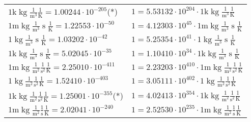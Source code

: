 \begin{center}
\begin{longtable}{l l}
{\color{gray}$1 \bm{\mathrm{ k}}\operatorname{kg}\frac1{\operatorname{m}^3}{}{}\frac1{\operatorname{K}} = 1.00244\cdot10^{-205} $}\quad(*) & {\color{gray}$ 1 = 5.53132\cdot10^{204} \cdot 1 \bm{\mathrm{ k}}\operatorname{kg}\frac1{\operatorname{m}^3}{}{}\frac1{\operatorname{K}}$}  \\
{\color{gray}$1 \bm{\mathrm{ m}}\operatorname{kg}\frac1{\operatorname{m}^3}{\operatorname{s}}{}\frac1{\operatorname{K}} = 1.22553\cdot10^{-50} $}   & {\color{gray}$ 1 = 4.12303\cdot10^{45} \cdot 1 \bm{\mathrm{ m}}\operatorname{kg}\frac1{\operatorname{m}^3}{\operatorname{s}}{}\frac1{\operatorname{K}}$}  \\
{\color{black}$1 \bm{\mathrm{ }}\operatorname{kg}\frac1{\operatorname{m}^3}{\operatorname{s}}{}\frac1{\operatorname{K}} = 1.03202\cdot10^{-42} $}   & {\color{black}$ 1 = 5.25354\cdot10^{41} \cdot 1 \bm{\mathrm{ }}\operatorname{kg}\frac1{\operatorname{m}^3}{\operatorname{s}}{}\frac1{\operatorname{K}}$}  \\
{\color{gray}$1 \bm{\mathrm{ k}}\operatorname{kg}\frac1{\operatorname{m}^3}{\operatorname{s}}{}\frac1{\operatorname{K}} = 5.02045\cdot10^{-35} $}   & {\color{gray}$ 1 = 1.10410\cdot10^{34} \cdot 1 \bm{\mathrm{ k}}\operatorname{kg}\frac1{\operatorname{m}^3}{\operatorname{s}}{}\frac1{\operatorname{K}}$}  \\
{\color{gray}$1 \bm{\mathrm{ m}}\operatorname{kg}\frac1{\operatorname{m}^2}\frac1{\operatorname{s}^2}{}\frac1{\operatorname{K}} = 2.25010\cdot10^{-411} $}   & {\color{gray}$ 1 = 2.23203\cdot10^{410} \cdot 1 \bm{\mathrm{ m}}\operatorname{kg}\frac1{\operatorname{m}^2}\frac1{\operatorname{s}^2}{}\frac1{\operatorname{K}}$}  \\
{\color{black}$1 \bm{\mathrm{ }}\operatorname{kg}\frac1{\operatorname{m}^2}\frac1{\operatorname{s}^2}{}\frac1{\operatorname{K}} = 1.52410\cdot10^{-403} $}   & {\color{black}$ 1 = 3.05111\cdot10^{402} \cdot 1 \bm{\mathrm{ }}\operatorname{kg}\frac1{\operatorname{m}^2}\frac1{\operatorname{s}^2}{}\frac1{\operatorname{K}}$}  \\
{\color{gray}$1 \bm{\mathrm{ k}}\operatorname{kg}\frac1{\operatorname{m}^2}\frac1{\operatorname{s}^2}{}\frac1{\operatorname{K}} = 1.25001\cdot10^{-355} $}\quad(*) & {\color{gray}$ 1 = 4.02413\cdot10^{354} \cdot 1 \bm{\mathrm{ k}}\operatorname{kg}\frac1{\operatorname{m}^2}\frac1{\operatorname{s}^2}{}\frac1{\operatorname{K}}$}  \\
{\color{gray}$1 \bm{\mathrm{ m}}\operatorname{kg}\frac1{\operatorname{m}^2}\frac1{\operatorname{s}}{}\frac1{\operatorname{K}} = 2.02041\cdot10^{-240} $}   & {\color{gray}$ 1 = 2.52530\cdot10^{235} \cdot 1 \bm{\mathrm{ m}}\operatorname{kg}\frac1{\operatorname{m}^2}\frac1{\operatorname{s}}{}\frac1{\operatorname{K}}$}  \\

\end{longtable}
\end{center}
